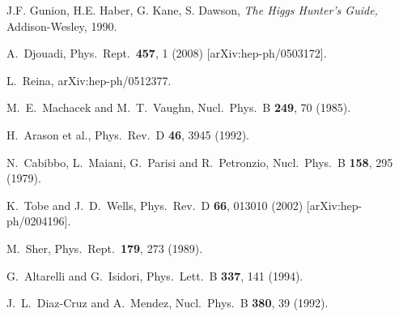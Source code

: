 \documentclass[12pt]{article}
\begin{document}
\begin{thebibliography}{9}
J.F. Gunion, H.E. Haber, G. Kane, S. Dawson, {\it The Higgs Hunter's Guide,} Addison-Wesley, 1990.

  A.~Djouadi,
  Phys.\ Rept.\  {\bf 457}, 1 (2008)
  [arXiv:hep-ph/0503172].


  L.~Reina,
  arXiv:hep-ph/0512377.


  M.~E.~Machacek and M.~T.~Vaughn,
  Nucl.\ Phys.\  B {\bf 249}, 70 (1985).

  H.~Arason et al.,
  Phys.\ Rev.\  D {\bf 46}, 3945 (1992).

  N.~Cabibbo, L.~Maiani, G.~Parisi and R.~Petronzio,
  Nucl.\ Phys.\  B {\bf 158}, 295 (1979).
  
  K.~Tobe and J.~D.~Wells,
  Phys.\ Rev.\  D {\bf 66}, 013010 (2002)
  [arXiv:hep-ph/0204196].



  M.~Sher,
  Phys.\ Rept.\  {\bf 179}, 273 (1989).

  G.~Altarelli and G.~Isidori,
  Phys.\ Lett.\  B {\bf 337}, 141 (1994).

  J.~L.~Diaz-Cruz and A.~Mendez,
  Nucl.\ Phys.\  B {\bf 380}, 39 (1992).


\end{thebibliography}
\end{document}
